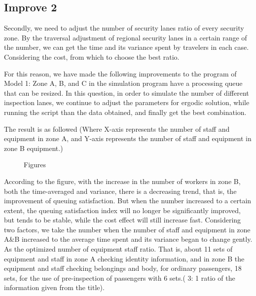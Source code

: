 \subsection{Improve 2}
Secondly, we need to adjust the number of security lanes ratio of every security zone. By the traversal adjustment of regional security lanes in a certain range of the number, we can get the time and its variance spent by travelers in each case. Considering the cost, from which to choose the best ratio.
\par
For this reason, we have made the following improvements to the program of Model 1:
Zone A, B, and C in the simulation program have a processing queue that can be resized. In this question, in order to simulate the number of different inspection lanes, we continue to adjust the parameters for ergodic solution, while running the script than the data obtained, and finally get the best combination.
\par
The result is as followed (Where X-axis represents the number of staff and equipment in zone A, and Y-axis represents the number of staff and equipment in zone B equipment.)

\begin{figure}[H]
\centering
{}
\caption{Figures}
\label{fig:Figures}
\end{figure}

According to the figure, with the increase in the number of workers in zone B, both the time-averaged and variance, there is a decreasing trend, that is, the improvement of queuing satisfaction. But when the number increased to a certain extent, the queuing satisfaction index will no longer be significantly improved, but tends to be stable, while the cost effect will still increase fast. Considering two factors, we take the number when the number of staff and equipment in zone A\&B increased to the average time spent and its variance began to change gently. As the optimized number of equipment staff ratio. That is, about 11 sets of equipment and staff in zone A checking identity information, and in zone B the equipment and staff checking belongings and body, for ordinary passengers, 18 sets, for the use of pre-inspection of passengers with 6 sets.( 3: 1 ratio of the information given from the title).

